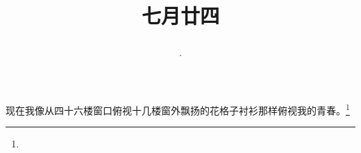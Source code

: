 \title{\date[d=27,m=8,y=2024][year:cn-y,年,month:cn,day:cn,日,·,weekday]·七月廿四 }
现在我像从四十六楼窗口俯视十几楼窗外飘扬的花格子衬衫那样俯视我的青春。\footnote{ }

